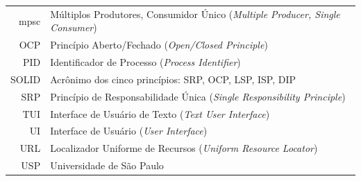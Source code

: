 \documentclass[a4paper,12pt,twoside,english,brazilian]{book}
\begin{document}
\begin{tabular}{rl}
   mpsc & Múltiplos Produtores, Consumidor Único (\emph{Multiple Producer, Single Consumer})\\
   OCP & Princípio Aberto/Fechado (\emph{Open/Closed Principle})\\
   PID & Identificador de Processo (\emph{Process Identifier})\\
  SOLID & Acrônimo dos cinco princípios: SRP, OCP, LSP, ISP, DIP\\
   SRP & Princípio de Responsabilidade Única (\emph{Single Responsibility Principle})\\
   TUI & Interface de Usuário de Texto (\emph{Text User Interface})\\
    UI & Interface de Usuário (\emph{User Interface})\\
   URL & Localizador Uniforme de Recursos (\emph{Uniform Resource Locator})\\
   USP & Universidade de São Paulo
\end{tabular}

\clearpage


\disablenewpage{\listoffigures}



\tableofcontents

\egroup %

\end{document}
